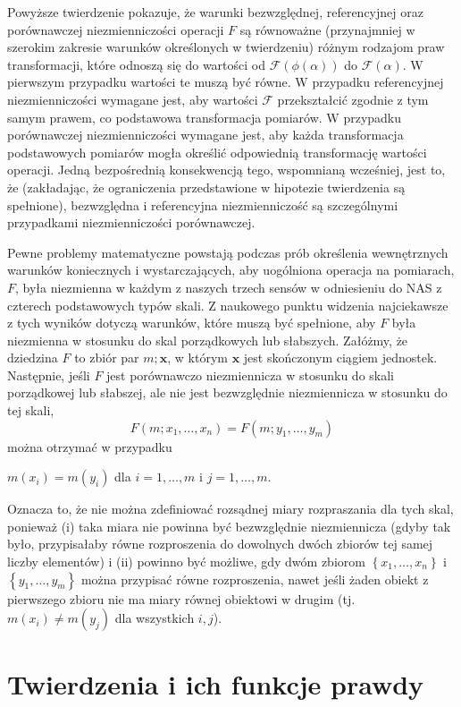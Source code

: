 \documentclass[12pt,a4paper]{report}
\newcommand{\zbior}[1]{\left\lbrace {#1} \right\rbrace }
\begin{document}
Powyższe twierdzenie pokazuje, że warunki bezwzględnej, referencyjnej oraz porównawczej niezmienniczości operacji $F$ są równoważne (przynajmniej w szerokim zakresie warunków określonych w twierdzeniu) różnym rodzajom praw transformacji, które odnoszą się do wartości od $\mathcal{F}(\phi(\alpha))$ do $\mathcal{F}(\alpha)$. W pierwszym przypadku wartości te muszą być równe. W przypadku referencyjnej niezmienniczości wymagane jest, aby wartości $\mathcal{F}$ przekształcić zgodnie z tym samym prawem, co podstawowa transformacja pomiarów. W przypadku porównawczej niezmienniczości  wymagane jest, aby każda transformacja podstawowych pomiarów mogła określić odpowiednią transformację wartości operacji. Jedną bezpośrednią konsekwencją tego, wspomnianą wcześniej, jest to, że (zakładając, że ograniczenia przedstawione w hipotezie twierdzenia są spełnione), bezwzględna i referencyjna niezmienniczość są szczególnymi przypadkami niezmienniczości porównawczej.

Pewne problemy matematyczne powstają podczas prób określenia wewnętrznych warunków koniecznych i wystarczających, aby uogólniona operacja na pomiarach, $F$, była niezmienna w każdym z naszych trzech sensów w odniesieniu do NAS z czterech podstawowych typów skali. Z naukowego punktu widzenia najciekawsze z tych wyników dotyczą warunków, które muszą być spełnione, aby $F$ była niezmienna w stosunku do skal porządkowych lub słabszych. Załóżmy, że dziedzina $F$ to zbiór par $m; \textbf{x}$, w którym $\textbf{x}$ jest skończonym ciągiem jednostek. Następnie, jeśli $F$ jest porównawczo niezmiennicza w stosunku do skali porządkowej lub słabszej, ale nie jest
bezwzględnie niezmiennicza w stosunku do tej skali,
\begin{equation*}
F(m;x_{1},\dots,x_{n})=F(m;y_{1},\dots,y_{m})
\end{equation*}
można otrzymać w przypadku
\begin{center}
$m(x_{i})=m(y_{i})$ dla $i=1,\dots,m$ i $j=1,\dots,m$.
\end{center}
Oznacza to, że nie można zdefiniować rozsądnej miary rozpraszania dla tych skal, ponieważ (i) taka miara nie powinna być bezwzględnie niezmiennicza (gdyby tak było, przypisałaby równe rozproszenia do dowolnych dwóch zbiorów tej samej liczby elementów) i (ii) powinno być możliwe, gdy dwóm zbiorom $\zbior{x_{1},\dots,x_{n}}$  i$\zbior{y_{1},\dots,y_{m}}$ można przypisać równe rozproszenia, nawet jeśli żaden obiekt z pierwszego zbioru nie ma miary równej obiektowi w drugim (tj.$ m(x_{i})\neq m(y_{j})$  dla wszystkich $i, j$).
\section{Twierdzenia i ich funkcje prawdy}
\end{document}
